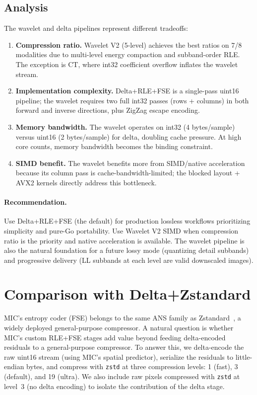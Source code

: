 \documentclass[11pt,twocolumn]{article}
\begin{document}
\subsection{Analysis}

The wavelet and delta pipelines represent different tradeoffs:

\begin{enumerate}[nosep]
    \item \textbf{Compression ratio.} Wavelet V2 (5-level) achieves the best ratios on 7/8 modalities due to multi-level energy compaction and subband-order RLE. The exception is CT, where int32 coefficient overflow inflates the wavelet stream.

    \item \textbf{Implementation complexity.} Delta+RLE+FSE is a single-pass uint16 pipeline; the wavelet requires two full int32 passes (rows + columns) in both forward and inverse directions, plus ZigZag escape encoding.

    \item \textbf{Memory bandwidth.} The wavelet operates on int32 (4 bytes/sample) versus uint16 (2 bytes/sample) for delta, doubling cache pressure. At high core counts, memory bandwidth becomes the binding constraint.

    \item \textbf{SIMD benefit.} The wavelet benefits more from SIMD/native acceleration because its column pass is cache-bandwidth-limited; the blocked layout + AVX2 kernels directly address this bottleneck.
\end{enumerate}

\paragraph{Recommendation.}
Use Delta+RLE+FSE (the default) for production lossless workflows prioritizing simplicity and pure-Go portability.
Use Wavelet V2 SIMD when compression ratio is the priority and native acceleration is available.
The wavelet pipeline is also the natural foundation for a future lossy mode (quantizing detail subbands) and progressive delivery (LL subbands at each level are valid downscaled images).

\section{Comparison with Delta+Zstandard}
\label{sec:deltazstd}

MIC's entropy coder (FSE) belongs to the same ANS family as Zstandard~\cite{zstd}, a widely deployed general-purpose compressor.
A natural question is whether MIC's custom RLE+FSE stages add value beyond feeding delta-encoded residuals to a general-purpose compressor.
To answer this, we delta-encode the raw uint16 stream (using MIC's spatial predictor), serialize the residuals to little-endian bytes, and compress with \texttt{zstd} at three compression levels: 1 (fast), 3 (default), and 19 (ultra).
We also include raw pixels compressed with \texttt{zstd} at level~3 (no delta encoding) to isolate the contribution of the delta stage.
\end{document}
